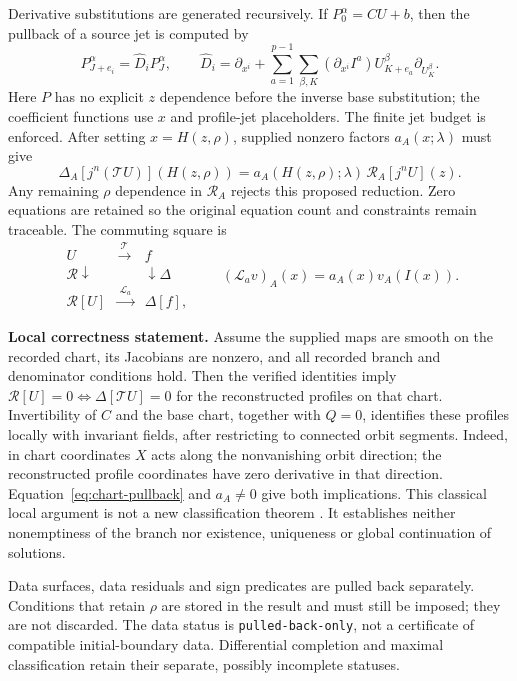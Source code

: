 \documentclass[11pt]{article}
\begin{document}
Derivative substitutions are generated recursively. If $P^\alpha_0=C U+b$,
then the pullback of a source jet is computed by
\begin{equation}
P^\alpha_{J+e_i}=\widehat D_i P^\alpha_J,\qquad
\widehat D_i=\partial_{x^i}
+\sum_{a=1}^{p-1}\sum_{\beta,K}
 (\partial_{x^i}I^a)U^\beta_{K+e_a}\partial_{U^\beta_K}.
\label{eq:pullback-recursion}
\end{equation}
Here $P$ has no explicit $z$ dependence before the inverse base substitution;
the coefficient functions use $x$ and profile-jet placeholders. The finite
jet budget is enforced. After setting $x=H(z,\rho)$, supplied nonzero factors
$a_A(x;\lambda)$ must give
\begin{equation}
\Delta_A[j^n(\mathcal TU)](H(z,\rho))
=a_A(H(z,\rho);\lambda)\,\mathcal R_A[j^nU](z).
\label{eq:chart-pullback}
\end{equation}
Any remaining $\rho$ dependence in $\mathcal R_A$ rejects this proposed
reduction. Zero equations are retained so the original equation count and
constraints remain traceable. The commuting square is
\[
\begin{array}{ccc}
U & \xrightarrow{\ \mathcal T\ } & f\\
{\scriptstyle\mathcal R}\downarrow &&
\downarrow{\scriptstyle\Delta}\\
\mathcal R[U] & \xrightarrow{\ \mathcal L_a\ } & \Delta[f],
\end{array}
\qquad (\mathcal L_a v)_A(x)=a_A(x)v_A(I(x)).
\]

\noindent\textbf{Local correctness statement.}
Assume the supplied maps are smooth on the recorded chart, its Jacobians
are nonzero, and all recorded branch and denominator conditions hold.
Then the verified identities imply
$\mathcal R[U]=0\Longleftrightarrow\Delta[\mathcal TU]=0$
for the reconstructed profiles on that chart. Invertibility of $C$ and the
base chart, together with $Q=0$, identifies these profiles locally with
invariant fields, after restricting to connected orbit segments.
Indeed, in chart coordinates $X$ acts along the nonvanishing orbit direction;
the reconstructed profile coordinates have zero derivative in that direction.
Equation~\eqref{eq:chart-pullback} and $a_A\ne0$ give both implications.
This classical local argument is not a new classification theorem
\cite{olver}. It establishes neither nonemptiness of the branch nor existence,
uniqueness or global continuation of solutions.

Data surfaces, data residuals and sign predicates are pulled back separately.
Conditions that retain $\rho$ are stored in the result and must still be
imposed; they are not discarded. The data status is
\texttt{pulled-back-only}, not a certificate of compatible initial-boundary
data. Differential completion and maximal classification retain their
separate, possibly incomplete statuses.
\end{document}
